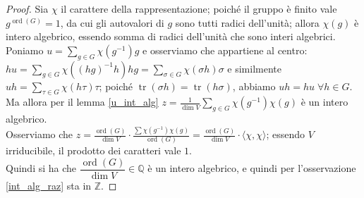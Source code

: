 \documentclass[11pt]{article}
\theoremstyle{plain}
\theoremstyle{definition}
\theoremstyle{remark}
\newcommand{\Q}{\mathbb{Q}}
\newcommand{\Z}{\mathbb{Z}}
\DeclareMathOperator{\tr}{tr}
\DeclareMathOperator{\ord}{ord}
\begin{document}
  \begin{proof}
   Sia $\chi$ il carattere della rappresentazione; poiché il gruppo è finito vale $g^{\ord(G)}=1$, da cui gli autovalori di $g$ sono tutti radici dell'unità; allora $\chi(g)$ è intero algebrico, essendo somma di radici dell'unità che sono interi algebrici.\\
   Poniamo $\displaystyle u=\sum_{g\in G}\chi(g^{-1})g$ e osserviamo che appartiene al centro: $\displaystyle hu=\sum_{g\in G} \chi((hg)^{-1}h)hg=\sum_{\sigma\in G} \chi(\sigma h)\sigma$ e similmente $\displaystyle uh=\sum_{\tau\in G}\chi(h\tau)\tau$; poiché $\tr(\sigma h)=\tr(h\sigma)$, abbiamo $uh=hu\;\forall h\in G$.\\
   Ma allora per il lemma \ref{u_int_alg} $z=\displaystyle\frac1{\dim V}\sum_{g\in G}\chi(g^{-1})\chi(g)$ è un intero algebrico.\\
   Osserviamo che $\displaystyle z=\frac{\ord(G)}{\dim V}\cdot \frac{\sum \chi(g^{-1})\chi(g)}{\ord(G)}=\frac{\ord(G)}{\dim V}\cdot\langle \chi,\chi\rangle$; essendo $V$ irriducibile, il prodotto dei caratteri vale $1$.\\
   Quindi si ha che $\dfrac{\ord(G)}{\dim V}\in\Q$ è un intero algebrico, e quindi per l'osservazione \ref{int_alg_raz} sta in $\Z$.
  \end{proof}


  



  

















	
\end{document}
